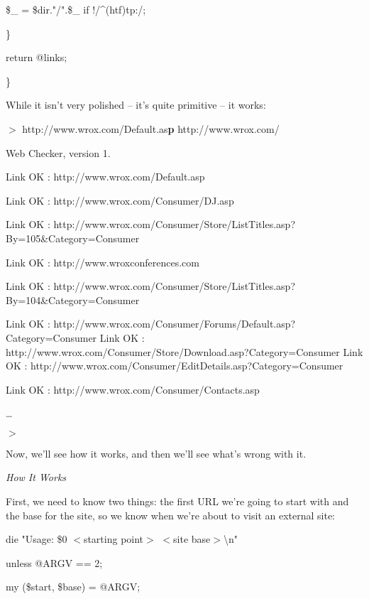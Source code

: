 \documentclass[a4paper,11pt]{book}
\begin{document}
\noindent \$\_  = \$dir."/".\$\_  if !/\^{}(ht\textbar f)tp:/;

\noindent \}

\noindent return @links;

\noindent \}

\noindent 

\noindent 

\noindent While it isn't very polished -- it's quite primitive -- it works:

\noindent 

\noindent $>$ http://www.wrox.com/Default.as\textbf{p }http://www.wrox.com/

\noindent Web Checker, version 1.

\noindent Link OK : http://www.wrox.com/Default.asp

\noindent Link OK : http://www.wrox.com/Consumer/DJ.asp

\noindent Link OK : http://www.wrox.com/Consumer/Store/ListTitles.asp?By=105\&Category=Consumer

\noindent Link OK : http://www.wroxconferences.com

\noindent Link OK : http://www.wrox.com/Consumer/Store/ListTitles.asp?By=104\&Category=Consumer

\noindent Link OK : http://www.wrox.com/Consumer/Forums/Default.asp?Category=Consumer Link OK : http://www.wrox.com/Consumer/Store/Download.asp?Category=Consumer Link OK : http://www.wrox.com/Consumer/EditDetails.asp?Category=Consumer

\noindent Link OK : http://www.wrox.com/Consumer/Contacts.asp

\noindent \dots 

\noindent $>$

\noindent Now, we'll see how it works, and then we'll see what's wrong with it.

\noindent 

\noindent \textit{How It Works}

\noindent First, we need to know two things: the first URL we're going to start with and the base for the site, so we know when we're about to visit an external site:

\noindent 

\noindent die "Usage: \$0 $<$starting point$>$ $<$site base$>$\textbackslash n"

\noindent unless @ARGV == 2;

\noindent 

\noindent my (\$start, \$base) = @ARGV;
\end{document}
